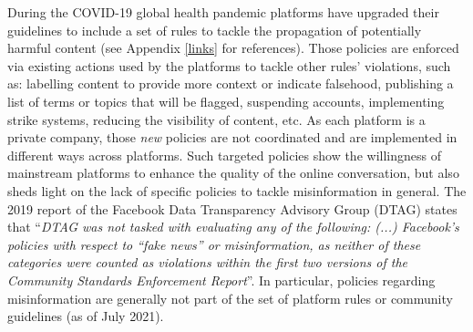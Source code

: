 \documentclass{article}
\begin{document}

\smallskip

During the COVID-19 global health pandemic platforms have upgraded their guidelines to include a set of rules to tackle the propagation of potentially harmful content (see Appendix \ref{links} for references). Those policies are enforced via existing actions used by the platforms to tackle other rules' violations, such as: labelling content to provide more context or indicate falsehood, publishing a list of terms or topics that will be flagged, suspending accounts, implementing strike systems, reducing the visibility of content, etc. As each platform is a private company, those {\it new} policies are not coordinated and are implemented in different ways across platforms. Such targeted policies show the willingness of mainstream platforms to enhance the quality of the online conversation, but also sheds light on the lack of specific policies to tackle misinformation in general. The 2019 report of the Facebook Data Transparency Advisory Group (DTAG) states that ``{\it DTAG was not tasked with evaluating any of the following: (...) Facebook’s policies with respect to “fake news” or misinformation, as neither of these categories were counted as violations within the first two versions of the Community Standards Enforcement Report}''. In particular, policies regarding misinformation are generally not part of the set of platform rules or community guidelines (as of July 2021).  %

\smallskip
 
\end{document}
